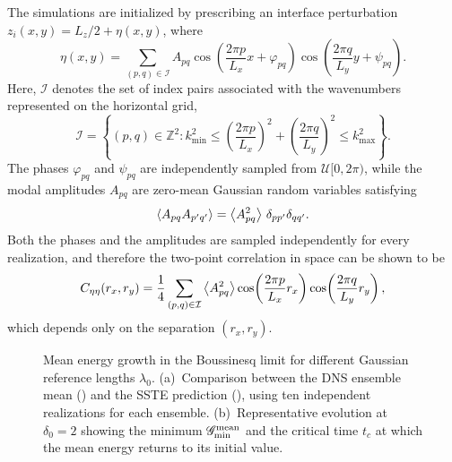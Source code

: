 The simulations are initialized by prescribing an interface perturbation
\(z_i(x,y)=L_z/2+\eta(x,y)\), where
\begin{equation}
  \eta(x,y)
  =
  \sum_{(p,q)\in\mathcal{I}}
  A_{pq}
  \cos\!\left(\frac{2\pi p}{L_x}x+\varphi_{pq}\right)
  \cos\!\left(\frac{2\pi q}{L_y}y+\psi_{pq}\right).
  \label{eq:dns_eta_construction}
\end{equation}
Here, \(\mathcal{I}\) denotes the set of index pairs associated with the wavenumbers represented on
the horizontal grid,
\begin{equation}
  \mathcal{I}
  =
  \left\{
    (p,q)\in\mathbb{Z}^2:
    k_{\min}^2
    \leq
    \left(\frac{2\pi p}{L_x}\right)^2
    +
    \left(\frac{2\pi q}{L_y}\right)^2
    \leq k_{\max}^2
  \right\}.
  \label{eq:dns_retained_wavevectors}
\end{equation}
The phases \(\varphi_{pq}\) and \(\psi_{pq}\) are
independently sampled from \(\mathcal{U}[0,2\pi)\), while the modal amplitudes \(A_{pq}\) are
zero-mean Gaussian random variables satisfying
\begin{equation}
  \left\langle A_{pq}A_{p'q'} \right\rangle
  =
  \left\langle A_{pq}^{2} \right\rangle\,\delta_{pp'}\delta_{qq'}.
  \label{eq:dns_uncorrelated_amplitudes}
\end{equation}
Both the phases and the amplitudes are sampled independently for every realization, and therefore
the two-point correlation in space can be shown to be
\begin{equation}
  C_{\eta\eta}(r_x,r_y)
  =
  \frac{1}{4}
  \sum_{(p,q)\in\mathcal{I}}
  \left\langle A_{pq}^{2} \right\rangle
  \cos\!\left(\frac{2\pi p}{L_x}r_x\right)
  \cos\!\left(\frac{2\pi q}{L_y}r_y\right),
  \label{eq:dns_eta_correlation}
\end{equation}
which depends only on the separation \((r_x,r_y)\).
\begin{figure}[t]
  \centering
  \begin{minipage}{0.48\textwidth}
    \centering
    
  \end{minipage}
  \hfill
  \begin{minipage}{0.48\textwidth}
    \centering
    
  \end{minipage}
  \caption{Mean energy growth in the Boussinesq limit for different Gaussian reference lengths
  \(\lambda_0\). (a)~Comparison between the DNS ensemble mean (\solidlegend) and the SSTE
  prediction (\circlegendfilled), using ten independent realizations for each ensemble.
  (b)~Representative evolution at \(\delta_0=2\) showing the
  minimum \(\mathscr{G}^{\mathrm{mean}}_{\min}\) and the critical time \(t_c\) at which the mean energy returns to its
  initial value.}
  \label{fig:compare_dns}
\end{figure}
